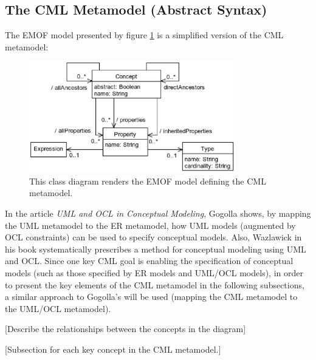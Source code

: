 \pagebreak[5]
\subsection{The CML Metamodel (Abstract Syntax)}\label{subsec:metamodel}

The EMOF \cite{mof} model presented by figure \ref{fig:metamodel} is a simplified version of the CML metamodel:

\begin{figure}
\centering
\includegraphics[width=0.8\textwidth]{language/diagram-metamodel}
\caption{This class diagram renders the EMOF \cite{mof} model defining the CML metamodel.}
\label{fig:metamodel}
\end{figure}


In the article \emph{UML and OCL in Conceptual Modeling}, 
Gogolla \cite{gogolla} shows, by mapping the UML \cite{uml} metamodel to the ER \cite{er} metamodel,
how UML models (augmented by OCL \cite{ocl} constraints) can be used to specify conceptual models.
Also, Wazlawick \cite{wazlawick} in his book systematically prescribes a method for conceptual modeling using UML and OCL. 
Since one key CML goal is enabling the specification of conceptual models
(such as those specified by ER models and UML/OCL models),
in order to present the key elements of the CML metamodel in the following subsections,
a similar approach to Gogolla's will be used (mapping the CML metamodel to the UML/OCL metamodel).

[Describe the relationships between the concepts in the diagram]

[Subsection for each key concept in the CML metamodel.]